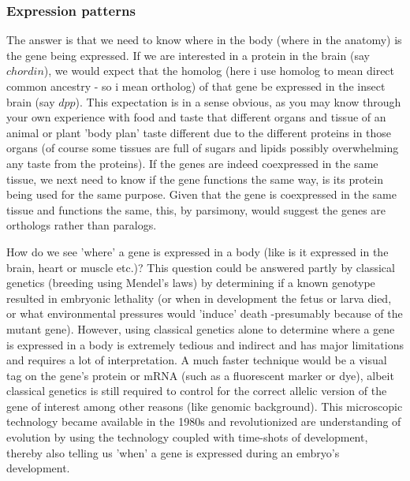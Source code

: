 \subsubsection*{Expression patterns}
The answer is that we need to know where in the body (where in the anatomy) is the gene being expressed.  If we are interested in a protein in the brain (say $chordin$), we would expect that the homolog (here i use homolog to mean direct common ancestry - so i mean ortholog) of that gene be expressed in the insect brain (say $dpp$).  This expectation is in a sense obvious, as you may know through your own experience with food and taste that different organs and tissue of an animal or plant 'body plan' taste different due to the different proteins in those organs (of course some tissues are full of sugars and lipids possibly overwhelming any taste from the proteins).  If the genes are indeed coexpressed in the same tissue, we next need to know if the gene functions the same way, is its protein being used for the same purpose.  Given that the gene is coexpressed in the same tissue and functions the same, this, by parsimony, would suggest the genes are orthologs rather than paralogs.

How do we see 'where' a gene is expressed in a body (like is it expressed in the brain, heart or muscle etc.)?  This question could be answered partly by classical genetics (breeding using Mendel's laws) by determining if a known genotype resulted in embryonic lethality (or when in development the fetus or larva died, or what environmental pressures would 'induce' death -presumably because of the mutant gene).  However, using classical genetics alone to determine where a gene is expressed in a body is extremely tedious and indirect and has major limitations and requires a lot of interpretation.  A much faster technique would be a visual tag on the gene's protein or mRNA (such as a fluorescent marker or dye), albeit classical genetics is still required to control for the correct allelic version of the gene of interest among other reasons (like genomic background).  This microscopic technology became available in the 1980s and revolutionized are understanding of evolution by using the technology coupled with time-shots of development, thereby also telling us 'when' a gene is expressed during an embryo's development.

